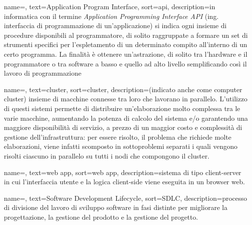 
\renewcommand{\acronymname}{Acronimi e abbreviazioni}




{
    name=,
    text=Application Program Interface,
    sort=api,
    description={in informatica con il termine \emph{Application Programming Interface API} (ing. interfaccia di programmazione di un'applicazione) si indica ogni insieme di procedure disponibili al programmatore, di solito raggruppate a formare un set di strumenti specifici per l'espletamento di un determinato compito all'interno di un certo programma. La finalità è ottenere un'astrazione, di solito tra l'hardware e il programmatore o tra software a basso e quello ad alto livello semplificando così il lavoro di programmazione}
}

{
    name=,
    text=cluster,
    sort=cluster,
    description={(indicato anche come computer cluster) insieme di macchine connesse tra loro che lavorano in parallelo.
    L'utilizzo di questi sistemi permette di distribuire un'elaborazione molto complessa tra le varie macchine, aumentando la potenza di calcolo del sistema e/o garantendo una maggiore disponibilità di servizio, a prezzo di un maggior costo e complessità di gestione dell'infrastruttura: per essere risolto, il problema che richiede molte elaborazioni, viene infatti scomposto in sottoproblemi separati i quali vengono risolti ciascuno in parallelo su tutti i nodi che compongono il cluster.}
}

{
	name=,
	text=web app,
	sort=web app,
	description={sistema di tipo client-server in cui l'interfaccia utente e la logica client-side viene eseguita in un browser web.}
}

{
	name=,
	text=Software Development Lifecycle,
	sort=SDLC,
	description={processo di divisione del lavoro di sviluppo software in fasi distinte per migliorare la progettazione, la gestione del prodotto e la gestione del progetto.}
}